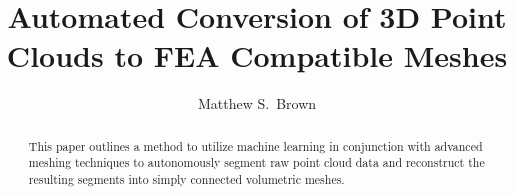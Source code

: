 \documentclass[12pt]{drexelthesis}
\title{Automated Conversion of 3D Point Clouds to FEA Compatible Meshes}
\author{Matthew S.~Brown}
\begin{document}
\maketitle
\begin{preliminary}

\newpage

\setcounter{page}{2}

\date{} %

\begin{dedication}

\end{dedication}

\begin{acknowledgements}

\end{acknowledgements}


\mytableofcontents\newpage

\setlength{\baselineskip}{0.5\baselineskip}
\listoftables\newpage

\listoffigures\newpage
\setlength{\baselineskip}{2.0\baselineskip}

\begin{abstract}
This paper outlines a method to utilize machine learning in conjunction with advanced meshing techniques to autonomously segment raw point cloud data and reconstruct the resulting segments into simply connected volumetric meshes.

\end{abstract}

\clearpage
\end{preliminary}
\thispagestyle{empty}
\newpage
\

\setcounter{page}{0}
\end{document}
